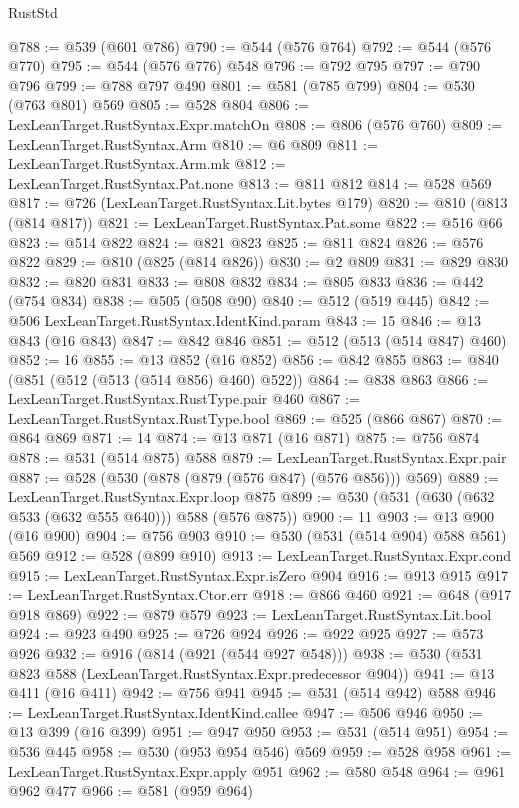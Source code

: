 \begin{lexlean}{RustStd}
\begin{coremodule}
@788 := @539 (@601 @786)
@790 := @544 (@576 @764)
@792 := @544 (@576 @770)
@795 := @544 (@576 @776) @548
@796 := @792 @795
@797 := @790 @796
@799 := @788 @797 @490
@801 := @581 (@785 @799)
@804 := @530 (@763 @801) @569
@805 := @528 @804
@806 := LexLeanTarget.RustSyntax.Expr.matchOn
@808 := @806 (@576 @760)
@809 := LexLeanTarget.RustSyntax.Arm
@810 := @6 @809
@811 := LexLeanTarget.RustSyntax.Arm.mk
@812 := LexLeanTarget.RustSyntax.Pat.none
@813 := @811 @812
@814 := @528 @569
@817 := @726 (LexLeanTarget.RustSyntax.Lit.bytes @179)
@820 := @810 (@813 (@814 @817))
@821 := LexLeanTarget.RustSyntax.Pat.some
@822 := @516 @66
@823 := @514 @822
@824 := @821 @823
@825 := @811 @824
@826 := @576 @822
@829 := @810 (@825 (@814 @826))
@830 := @2 @809
@831 := @829 @830
@832 := @820 @831
@833 := @808 @832
@834 := @805 @833
@836 := @442 (@754 @834)
@838 := @505 (@508 @90)
@840 := @512 (@519 @445)
@842 := @506 LexLeanTarget.RustSyntax.IdentKind.param
@843 := 15
@846 := @13 @843 (@16 @843)
@847 := @842 @846
@851 := @512 (@513 (@514 @847) @460)
@852 := 16
@855 := @13 @852 (@16 @852)
@856 := @842 @855
@863 := @840 (@851 (@512 (@513 (@514 @856) @460) @522))
@864 := @838 @863
@866 := LexLeanTarget.RustSyntax.RustType.pair @460
@867 := LexLeanTarget.RustSyntax.RustType.bool
@869 := @525 (@866 @867)
@870 := @864 @869
@871 := 14
@874 := @13 @871 (@16 @871)
@875 := @756 @874
@878 := @531 (@514 @875) @588
@879 := LexLeanTarget.RustSyntax.Expr.pair
@887 := @528 (@530 (@878 (@879 (@576 @847) (@576 @856))) @569)
@889 := LexLeanTarget.RustSyntax.Expr.loop @875
@899 := @530 (@531 (@630 (@632 @533 (@632 @555 @640))) @588 (@576 @875))
@900 := 11
@903 := @13 @900 (@16 @900)
@904 := @756 @903
@910 := @530 (@531 (@514 @904) @588 @561) @569
@912 := @528 (@899 @910)
@913 := LexLeanTarget.RustSyntax.Expr.cond
@915 := LexLeanTarget.RustSyntax.Expr.isZero @904
@916 := @913 @915
@917 := LexLeanTarget.RustSyntax.Ctor.err
@918 := @866 @460
@921 := @648 (@917 @918 @869)
@922 := @879 @579
@923 := LexLeanTarget.RustSyntax.Lit.bool
@924 := @923 @490
@925 := @726 @924
@926 := @922 @925
@927 := @573 @926
@932 := @916 (@814 (@921 (@544 @927 @548)))
@938 := @530 (@531 @823 @588 (LexLeanTarget.RustSyntax.Expr.predecessor @904))
@941 := @13 @411 (@16 @411)
@942 := @756 @941
@945 := @531 (@514 @942) @588
@946 := LexLeanTarget.RustSyntax.IdentKind.callee
@947 := @506 @946
@950 := @13 @399 (@16 @399)
@951 := @947 @950
@953 := @531 (@514 @951)
@954 := @536 @445
@958 := @530 (@953 @954 @546) @569
@959 := @528 @958
@961 := LexLeanTarget.RustSyntax.Expr.apply @951
@962 := @580 @548
@964 := @961 @962 @477
@966 := @581 (@959 @964)

\end{coremodule}
\end{lexlean}
